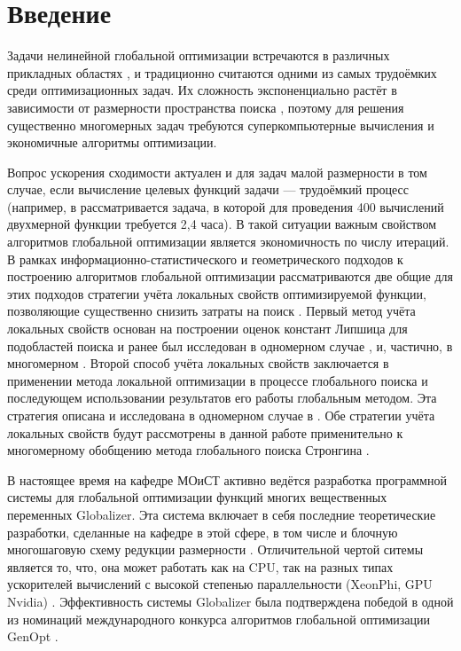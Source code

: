 \section{Введение}
Задачи нелинейной глобальной оптимизации встречаются в различных прикладных областях \cite{Kvasov2013, Barkalov2013},
и традиционно считаются одними из самых трудоёмких среди оптимизационных задач.
Их сложность экспоненциально растёт в зависимости от размерности пространства поиска \cite{Vavasis1995},
поэтому для решения существенно многомерных задач требуются суперкомпьютерные вычисления и
экономичные алгоритмы оптимизации.

Вопрос ускорения сходимости актуален и для задач малой размерности в том случае, если вычисление
целевых функций задачи --- трудоёмкий процесс (например, в \cite{Barkalov2013} рассматривается
задача, в которой для проведения 400 вычислений двухмерной функции требуется 2,4 часа).
В такой ситуации важным свойством алгоритмов глобальной оптимизации является экономичность по
числу итераций. В рамках информационно-статистического \cite{strOptBook} и геометрического подходов \cite{piyavskij1972} к
построению алгоритмов глобальной оптимизации рассматриваются две общие для этих подходов
стратегии учёта локальных свойств оптимизируемой функции, позволяющие существенно
снизить затраты на поиск \cite{sergLocalTuning}. Первый метод учёта локальных свойств
основан на построении оценок констант Липшица для подобластей поиска и ранее был
исследован в одномерном случае \cite{sergLocalTuning,nestedLocal}, и, частично, в многомерном \cite{strongSerg}.
Второй способ учёта локальных свойств заключается в применении метода локальной оптимизации в процессе глобального
поиска и последующем использовании результатов его работы глобальным методом. Эта стратегия
описана и исследована в одномерном случае в \cite{sergLocalTuning}. Обе стратегии
учёта локальных свойств будут рассмотрены в данной работе применительно к многомерному
обобщению метода глобального поиска Стронгина \cite{strOptBook}.

В настоящее время на кафедре МОиСТ активно ведётся разработка программной системы
для глобальной оптимизации функций многих вещественных переменных Globalizer.
Эта система включает в себя последние теоретические разработки, сделанные на кафедре в
этой сфере, в том числе и блочную многошаговую схему редукции размерности \cite{blockNested}.
Отличительной чертой ситемы является то, что, она может работать как на CPU, так на
разных типах ускорителей вычислений с высокой степенью параллельности (XeonPhi, GPU Nvidia) \cite{examinArtcle, examinPhiArtcle}.
Эффективность системы Globalizer была подтверждена победой в одной из номинаций международного конкурса алгоритмов
глобальной оптимизации GenOpt \cite{lebedevSovrasov2016}.

